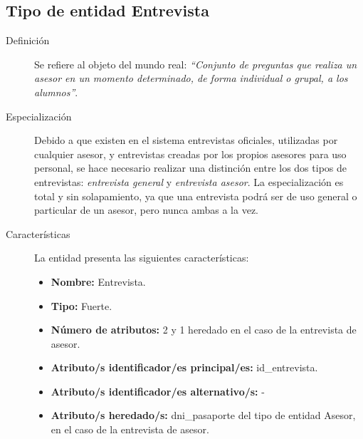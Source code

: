 \subsection{Tipo de entidad Entrevista}

   \begin{description}

   \item[Definición] Se refiere al objeto del mundo real: \emph{``Conjunto de
   preguntas que realiza un asesor en un momento determinado, de forma
   individual o grupal, a los alumnos''}.

   \item[Especialización] Debido a que existen en el sistema entrevistas
   oficiales, utilizadas por cualquier asesor, y entrevistas creadas por los
   propios asesores para uso personal, se hace necesario realizar una distinción
   entre los dos tipos de entrevistas: \textit{entrevista general} y
   \textit{entrevista asesor}. La especialización es total y sin solapamiento,
   ya que una entrevista podrá ser de uso general o particular de un asesor,
   pero nunca ambas a la vez.

   \item[Características] La entidad presenta las siguientes características:
      \begin{itemize}
         \item \textbf{Nombre:} Entrevista.
         \item \textbf{Tipo:} Fuerte.
         \item \textbf{Número de atributos:} 2 y 1 heredado en el caso de la
         entrevista de asesor.
         \item \textbf{Atributo/s identificador/es principal/es:} id\_entrevista.
         \item \textbf{Atributo/s identificador/es alternativo/s:} -
         \item \textbf{Atributo/s heredado/s:} dni\_pasaporte del tipo de
         entidad Asesor, en el caso de la entrevista de asesor.
      \end{itemize}


\end{description}
